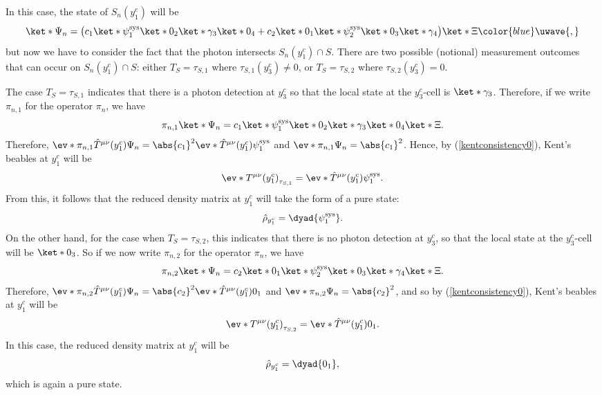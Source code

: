\documentclass[12pt]{report}
\providecommand{\DIFadd}[1]{{\protect\color{blue}\uwave{#1}}} %
\providecommand{\DIFaddbegin}{} %
\providecommand{\DIFaddend}{} %
\begin{document}
In this case, the state of $S_n(y^c_1)$ will be
 \begin{equation*}
 \ket*{\Psi_n}=\big(c_1\ket*{\psi_1^\text{sys}}\ket*{0_2}\ket*{\gamma_3}\ket*{0_4}+c_2\ket*{0_1}\ket*{\psi_2^\text{sys}}\ket*{0_3}\ket*{\gamma_4}\big)\ket*{\Xi}\DIFaddbegin \DIFadd{,
 }\DIFaddend \end{equation*}
 but now we have to consider the fact that the photon intersects $S_n(y^c_1)\cap S$. There are two possible (notional) measurement outcomes that can occur on $S_n(y^c_1)\cap S$: either $T_S=\tau_{S,1}$ where $\tau_{S,1}(y^c_3)\neq 0$, or $T_S=\tau_{S,2}$ where $\tau_{S,2}(y^c_3)=0.$ 

 The case  $T_S=\tau_{S,1}$ indicates that there is a photon detection at $y^c_3$ so that the local state at the $y^c_3$-cell is $\ket*{\gamma_3}$. Therefore, if we write $\pi_{n,1}$ for the operator $\pi_n$, we have 
 $$\pi_{n,1}\ket*{\Psi_n}=c_1\ket*{\psi_1^\text{sys}}\ket*{0_2}\ket*{\gamma_3}\ket*{0_4}\ket*{\Xi}.$$
 Therefore, 
 $\ev*{\pi_{n,1}\hat{T}^{\mu\nu}(y^c_1)}{\Psi_n}=\abs{c_1}^2\ev*{\hat{T}^{\mu\nu}(y^c_1)}{\psi_1^\text{sys}}$ and  $\ev*{\pi_{n,1}}{\Psi_n}=\abs{c_1}^2$. Hence, by (\ref{kentconsistency0}), Kent's beables at $y^c_1$ will be 
 $$\ev*{T^{\mu\nu}(y^c_1)}_{\tau_{S,1}}=\ev*{\hat{T}^{\mu\nu}(y^c_1)}{\psi_1^\text{sys}}.$$ 
 From this, it follows that the reduced density matrix at $y^c_1$ will take the form of a pure state:
 \begin{equation}\label{purerho}
\hat{\rho}_{y^c_1}= \dyad{\psi_1^\text{sys}}.
\end{equation} 
 On the other hand, for the case when  $T_S=\tau_{S,2}$, this indicates that there is no photon detection at $y^c_3$, so that the local state at the $y^c_3$-cell will be $\ket*{0_3}$. So if we now  write $\pi_{n,2}$ for the operator $\pi_n$, we have 
 $$\pi_{n,2}\ket*{\Psi_n}=c_2\ket*{0_1}\ket*{\psi_2^\text{sys}}\ket*{0_3}\ket*{\gamma_4}\ket*{\Xi}.$$
 Therefore, 
 $\ev*{\pi_{n,2}\hat{T}^{\mu\nu}(y^c_1)}{\Psi_n}=\abs{c_2}^2\ev*{\hat{T}^{\mu\nu}(y^c_1)}{0_1}$ and  $\ev*{\pi_{n,2}}{\Psi_n}=\abs{c_2}^2$,  
  and so by (\ref{kentconsistency0}), Kent's beables at $y^c_1$ will be 
 $$\ev*{T^{\mu\nu}(y^c_1)}_{\tau_{S,2}}=\ev*{\hat{T}^{\mu\nu}(y^c_1)}{0_1}.$$
 In this case, the reduced density matrix at $y^c_1$  will be
  \begin{equation}
\hat{\rho}_{y^c_1}= \dyad{0_1},
\end{equation} 
which is again a pure state.
\end{document}
